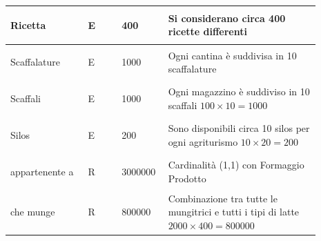 \documentclass[12pt,a4paper]{article}
\begin{document}
\begin{center}
\begin{longtable}{|p{0.23\linewidth}|p{0.1\linewidth}|p{0.11\linewidth}|p{0.45\linewidth}|}
\hline
Ricetta 				& \begin{center}
\vspace{-25pt}E
\end{center}
					& \begin{center}
					\vspace{-25pt}400\end{center}
					&  Si considerano circa 400 ricette differenti \\ 

\hline
Scaffalature 				& \begin{center}
\vspace{-25pt}E
\end{center}
					& \begin{center}
					\vspace{-25pt}1000\end{center}
					&  Ogni cantina è suddivisa in 10 scaffalature \\ 

\hline
Scaffali 				& \begin{center}
\vspace{-25pt}E
\end{center}
					& \begin{center}
					\vspace{-25pt}1000\end{center}
					&  Ogni magazzino è suddiviso in 10 scaffali $100\times 10=1000$\\ 

\hline
Silos 				& \begin{center}
\vspace{-25pt}E
\end{center}
					& \begin{center}
					\vspace{-25pt}200\end{center}
					&  Sono disponibili circa 10 silos per ogni agriturismo $10\times 20=200$ \\ 

\hline
appartenente a 				& \begin{center}
\vspace{-25pt}R
\end{center}
					& \begin{center}
					\vspace{-25pt}3000000\end{center}
					&  Cardinalità (1,1) con Formaggio Prodotto \\ 

\hline
che munge 				& \begin{center}
\vspace{-25pt}R
\end{center}
					& \begin{center}
					\vspace{-25pt}800000\end{center}
					&  Combinazione tra tutte le mungitrici e tutti i tipi di latte $2000\times 400= 800000$ \\ 


\end{longtable}
\end{center}
\end{document}
